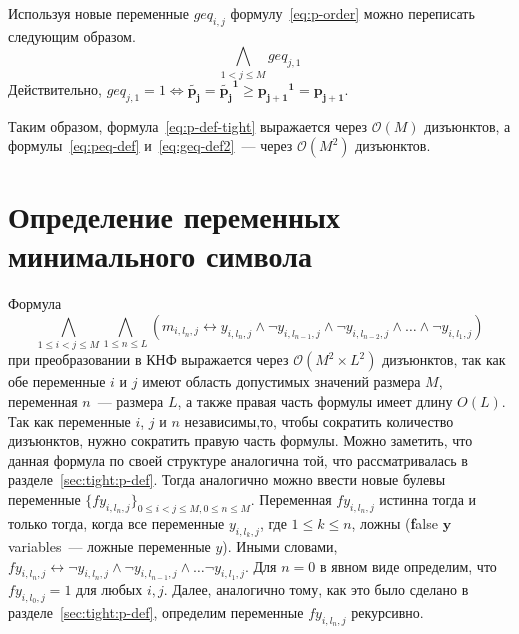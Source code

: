 Используя новые переменные $\mathit{geq}_{i,j}$ формулу~\eqref{eq:p-order} можно переписать следующим образом.
%
\begin{equation}
\label{eq:p-order-tight}
  \bigwedge_{1 < j \leq M} \mathit{geq}_{j,1}
\end{equation}
%
Действительно, $\mathit{geq}_{j,1} = 1 \Leftrightarrow \tilde{\mathbf{p_{j}}} = \tilde{\mathbf{p_{j}}}^\mathbf{1} \geq \mathbf{p_{j + 1}}^{\mathbf{1}} = \mathbf{p_{j + 1}}$.

Таким образом, формула~\eqref{eq:p-def-tight} выражается через $\mathcal{O}\left(M\right)$ дизъюнктов, а формулы~\eqref{eq:peq-def} и~\eqref{eq:geq-def2}~{---} через $\mathcal{O}\left(M^{2}\right)$ дизъюнктов.


\section{Определение переменных минимального символа}
\label{sec:tight:m-def}

Формула $$\bigwedge_{1 \leq i < j \leq M} \bigwedge_{1 \leq n \leq L} \left(m_{i,l_{n},j} \leftrightarrow y_{i,l_{n},j} \wedge \neg y_{i,l_{n - 1}, j} \wedge \neg y_{i,l_{n - 2}, j} \wedge \ldots \wedge \neg y_{i,l_{1},j} \right)$$ при преобразовании в КНФ выражается через $\mathcal{O}\left(M^{2} \times L^{2}\right)$ дизъюнктов, так как обе переменные $i$ и $j$ имеют область допустимых значений размера $M$, переменная $n$~{---} размера $L$, а также правая часть формулы имеет длину $O\left(L\right)$.
Так как переменные $i$, $j$ и $n$ независимы,то, чтобы сократить количество дизъюнктов, нужно сократить правую часть формулы.
Можно заметить, что данная формула по своей структуре аналогична той, что рассматривалась в разделе~\ref{sec:tight:p-def}.
Тогда аналогично можно ввести новые булевы переменные $\{\mathit{fy}_{i,l_{n},j}\}_{0 \leq i < j \leq M,0 \leq n \leq M}$.
Переменная $\mathit{fy}_{i,l_{n},j}$ истинна тогда и только тогда, когда все переменные $y_{i,l_{k},j}$, где $1 \leq k \leq n$, ложны (\textbf{f}alse $\boldsymbol{y}$ variables~{---} ложные переменные $y$).
Иными словами, $\mathit{fy}_{i,l_{n},j} \leftrightarrow \neg y_{i,l_{n},j} \wedge \neg y_{i, l_{n - 1}, j} \wedge \ldots \neg y_{i,l_{1},j}$. 
Для $n = 0$ в явном виде определим, что $\mathit{fy}_{i,l_{0},j} = 1$ для любых $i,j$.
Далее, аналогично тому, как это было сделано в разделе~\ref{sec:tight:p-def}, определим переменные $\mathit{fy}_{i,l_{n},j}$ рекурсивно.


